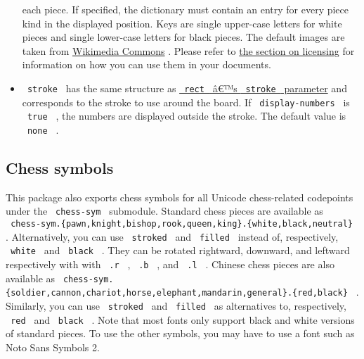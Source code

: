 \begin{itemize}
  each piece. If specified, the dictionary must contain an entry for
  every piece kind in the displayed position. Keys are single upper-case
  letters for white pieces and single lower-case letters for black
  pieces. The default images are taken from
  \href{https://commons.wikimedia.org/wiki/Category:SVG_chess_pieces}{Wikimedia
  Commons} . Please refer to
  \href{https://github.com/typst/packages/raw/main/packages/preview/board-n-pieces/0.5.0/\#licensing}{the
  section on licensing} for information on how you can use them in your
  documents.
\item
  \texttt{\ stroke\ } has the same structure as
  \href{https://typst.app/docs/reference/visualize/rect/\#parameters-stroke}{\texttt{\ rect\ }
  â€™s \texttt{\ stroke\ } parameter} and corresponds to the stroke to
  use around the board. If \texttt{\ display-numbers\ } is
  \texttt{\ true\ } , the numbers are displayed outside the stroke. The
  default value is \texttt{\ none\ } .
\end{itemize}

\subsection{Chess symbols}\label{chess-symbols}

This package also exports chess symbols for all Unicode chess-related
codepoints under the \texttt{\ chess-sym\ } submodule. Standard chess
pieces are available as
\texttt{\ chess-sym.\{pawn,knight,bishop,rook,queen,king\}.\{white,black,neutral\}\ }
. Alternatively, you can use \texttt{\ stroked\ } and
\texttt{\ filled\ } instead of, respectively, \texttt{\ white\ } and
\texttt{\ black\ } . They can be rotated rightward, downward, and
leftward respectively with with \texttt{\ .r\ } , \texttt{\ .b\ } , and
\texttt{\ .l\ } . Chinese chess pieces are also available as
\texttt{\ chess-sym.\{soldier,cannon,chariot,horse,elephant,mandarin,general\}.\{red,black\}\ }
. Similarly, you can use \texttt{\ stroked\ } and \texttt{\ filled\ } as
alternatives to, respectively, \texttt{\ red\ } and \texttt{\ black\ } .
Note that most fonts only support black and white versions of standard
pieces. To use the other symbols, you may have to use a font such as
Noto Sans Symbols 2.

\begin{Shaded}
\begin{Highlighting}[]
\end{Highlighting}
\end{Shaded}

